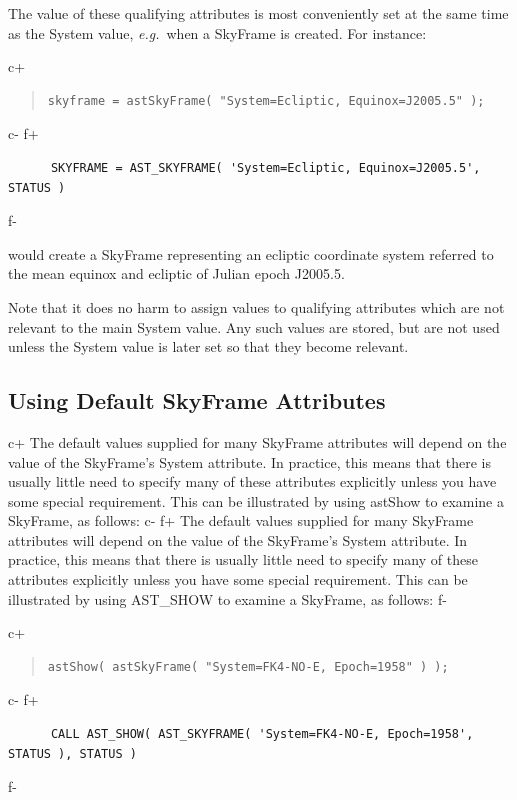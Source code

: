 \documentclass[twoside,11pt]{article}
\begin{document}
The value of these qualifying attributes is most conveniently set at
the same time as the System value, {\em{e.g.}}\ when a SkyFrame is
created. For instance:

c+
\begin{quote}
\small
\begin{verbatim}
skyframe = astSkyFrame( "System=Ecliptic, Equinox=J2005.5" );
\end{verbatim}
\normalsize
\end{quote}
c-
f+
\small
\begin{verbatim}
      SKYFRAME = AST_SKYFRAME( 'System=Ecliptic, Equinox=J2005.5', STATUS )
\end{verbatim}
\normalsize
f-

would create a SkyFrame representing an ecliptic coordinate system
referred to the mean equinox and ecliptic of Julian epoch J2005.5.

Note that it does no harm to assign values to qualifying attributes
which are not relevant to the main System value. Any such values are
stored, but are not used unless the System value is later set so that
they become relevant.

\subsection{Using Default SkyFrame Attributes}

c+
The default values supplied for many SkyFrame attributes will depend
on the value of the SkyFrame's System attribute. In practice, this
means that there is usually little need to specify many of these
attributes explicitly unless you have some special requirement. This
can be illustrated by using astShow to examine a SkyFrame, as follows:
c-
f+
The default values supplied for many SkyFrame attributes will depend
on the value of the SkyFrame's System attribute. In practice, this
means that there is usually little need to specify many of these
attributes explicitly unless you have some special requirement. This
can be illustrated by using AST\_SHOW to examine a SkyFrame, as
follows:
f-

c+
\begin{quote}
\small
\begin{verbatim}
astShow( astSkyFrame( "System=FK4-NO-E, Epoch=1958" ) );
\end{verbatim}
\normalsize
\end{quote}
c-
f+
\small
\begin{verbatim}
      CALL AST_SHOW( AST_SKYFRAME( 'System=FK4-NO-E, Epoch=1958', STATUS ), STATUS )
\end{verbatim}
\normalsize
f-
\end{document}
